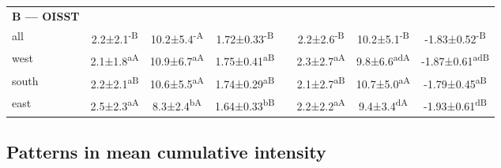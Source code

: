 \documentclass[a4paper,10pt,review]{elsarticle}
\begin{document}
\begin{table}[]
\begin{tiny}
\begin{tabular}{lccccccc}
{\bf{B --- OISST}} \\
all & 2.2±2.1\textsuperscript{-B} & 10.2±5.4\textsuperscript{-A} & 1.72±0.33\textsuperscript{-B} && 2.2±2.6\textsuperscript{-B} & 10.2±5.1\textsuperscript{-B} & -1.83±0.52\textsuperscript{-B} \\
west & 2.1±1.8\textsuperscript{aA} & 10.9±6.7\textsuperscript{aA} & 1.75±0.41\textsuperscript{aB} && 2.3±2.7\textsuperscript{aA} & 9.8±6.6\textsuperscript{adA} & -1.87±0.61\textsuperscript{adB} \\
south & 2.2±2.1\textsuperscript{aB} & 10.6±5.5\textsuperscript{aA} & 1.74±0.29\textsuperscript{aB} && 2.1±2.7\textsuperscript{aB} & 10.7±5.0\textsuperscript{aA} & -1.79±0.45\textsuperscript{aB} \\
east & 2.5±2.3\textsuperscript{aA} & 8.3±2.4\textsuperscript{bA} & 1.64±0.33\textsuperscript{bB} && 2.2±2.2\textsuperscript{aA} & 9.4±3.4\textsuperscript{dA} & -1.93±0.61\textsuperscript{dB} \\
\bottomrule
\end{tabular}
\end{tiny}
\end{table}

\subsection{Patterns in mean cumulative intensity}
\end{document}
